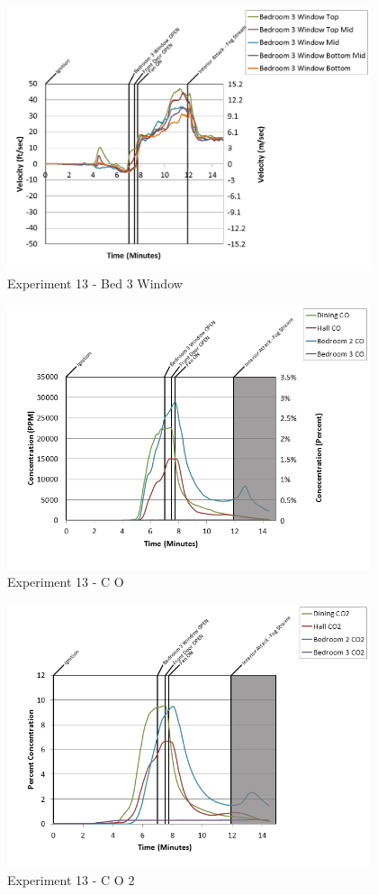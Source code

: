 \documentclass{article}
\begin{document}
\begin{appendices}
\begin{figure}[h!]
	\centering
	\includegraphics[height=3.05in]{0_Images/Results_Charts/Exp_13_Charts/Bed3Window.png}
	\caption{Experiment 13 - Bed 3 Window}
\end{figure}

\clearpage

\begin{figure}[h!]
	\centering
	\includegraphics[height=3.05in]{0_Images/Results_Charts/Exp_13_Charts/CO.png}
	\caption{Experiment 13 - C O}
\end{figure}


\begin{figure}[h!]
	\centering
	\includegraphics[height=3.05in]{0_Images/Results_Charts/Exp_13_Charts/CO2.png}
	\caption{Experiment 13 - C O 2}
\end{figure}


\end{appendices}
\end{document}
